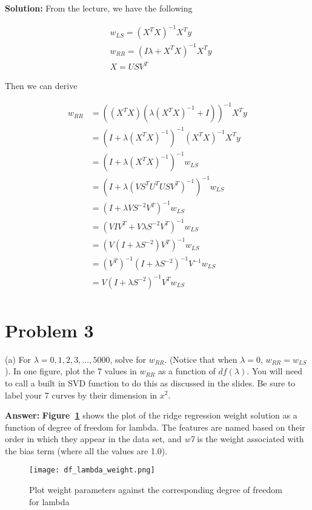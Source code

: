 \documentclass[11pt]{report}
\begin{document}
\justify
\textbf{Solution:} From the lecture, we have the following

\begin{align*}
&w_{LS} = (X^T X)^{-1} X^T y \\
&w_{RR} = (I \lambda + X^T X)^{-1} X^T y \\
&X = USV^T
\end{align*}

\justify
Then we can derive

\begin{equation*}
\begin{split}
w_{RR} &= ((X^TX) (\lambda (X^TX)^{-1} + I))^{-1} X^T y \\
&= (I + \lambda (X^TX)^{-1})^{-1} (X^TX)^{-1} X^T y \\
&= (I + \lambda (X^TX)^{-1})^{-1} w_{LS} \\
&= (I + \lambda (V S^T U^T U S V^T)^{-1})^{-1} w_{LS} \\
&= (I + \lambda V S^{-2} V^T)^{-1} w_{LS} \\
&= (V I V^T + V \lambda S^{-2} V^T)^{-1} w_{LS} \\
&= (V (I + \lambda S^{-2}) V^T )^{-1} w_{LS} \\
&= (V^T)^{-1} (I + \lambda S^{-2})^{-1} V^{-1}  w_{LS} \\
&= V (I + \lambda S^{-2})^{-1} V^T  w_{LS} \\
\end{split} 
\end{equation*}

\pagebreak

\section{Problem 3}
(a) For $\lambda = 0, 1, 2 ,3, ..., 5000$, solve for $w_{RR}$. (Notice that when $\lambda = 0$, $w_{RR} = w_{LS}$). In one figure, plot the 7 values in $w_{RR}$ as a function of $df(\lambda)$. You will need to call a built in SVD function to do this as discussed in the slides. Be sure to label your 7 curves by their dimension in ${x^2}$.

\justify
\textbf{Answer:} \textbf{Figure~\ref{fig:df_lambda_weight}}  shows the plot of the ridge regression weight solution as a function of degree of freedom for lambda. The features are named based on their order in which they appear in the data set, and \emph{w7} is the weight associated with the bias term (where all the values are 1.0). 

\begin{figure}[h]
\texttt{[image: df\_lambda\_weight.png]}
\centering
\caption{Plot weight parameters against the corresponding degree of freedom for lambda}
\label{fig:df_lambda_weight}
\end{figure}
\end{document}
